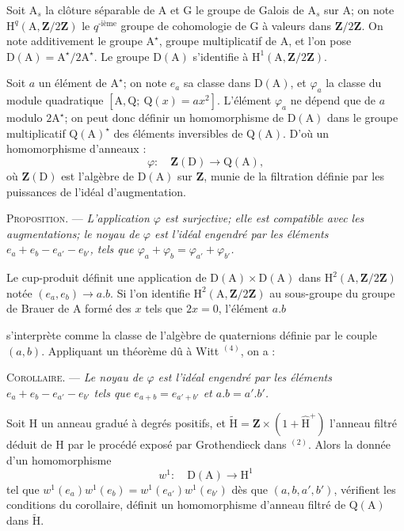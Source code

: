 Soit $\mathrm A_s$ la clôture séparable de $\mathrm A$ et $\mathrm G$ le groupe de Galois
de $\mathrm A_s$ sur $\mathrm A$; on note $\mathrm H^q(\mathrm A,\mathbf Z/2\mathbf Z)$
le $q^{\text{-ième}}$ groupe de cohomologie de $\mathrm G$ à valeurs dans
$\mathbf Z/2\mathbf Z$. On note additivement le groupe $\mathrm A^\star$,
groupe multiplicatif de $\mathrm A$, et l'on pose
$\mathrm D(\mathrm A)=\mathrm A^\star/2\mathrm A^\star$.
Le groupe $\mathrm D(\mathrm A)$ s'identifie à
$\mathrm H^1(\mathrm A,\mathbf Z/2\mathbf Z)$.

Soit $a$ un élément de $\mathrm A^\star$; on note $e_a$ sa classe dans
$\mathrm D(\mathrm A)$, et $\varphi_a$ la classe du module quadratique
$[\mathrm A,\mathrm Q;\ \mathrm Q(x)=ax^2]$.
L'élément $\varphi_a$ ne dépend que de $a$ modulo $2\mathrm A^\star$;
on peut donc définir un homomorphisme de $\mathrm D(\mathrm A)$ dans le groupe
multiplicatif $\mathrm Q(\mathrm A)^\star$ des éléments inversibles de $\mathrm Q(\mathrm A)$.
D'où un homomorphisme d'anneaux :
\[
\varphi:\quad\mathbf Z(\mathrm D)\to\mathrm Q(\mathrm A),
\]
où $\mathbf Z(\mathrm D)$ est l'algèbre de $\mathrm D(\mathrm A)$ sur $\mathbf Z$,
munie de la filtration définie par les puissances de l'idéal d'augmentation.

\textsc{Proposition.} --- \textit{L'application $\varphi$ est surjective; elle est
compatible avec les augmentations; le noyau de $\varphi$ est l'idéal engendré
par les éléments $e_a+e_b-e_{a'}-e_{b'}$, tels que
$\varphi_a+\varphi_b=\varphi_{a'}+\varphi_{b'}$.}

Le cup-produit définit une application de $\mathrm D(\mathrm A)\times\mathrm D(\mathrm A)$
dans $\mathrm H^2(\mathrm A,\mathbf Z/2\mathbf Z)$ notée $(e_a,e_b)\to a.b$.
Si l'on identifie $\mathrm H^2(\mathrm A,\mathbf Z/2\mathbf Z)$ au sous-groupe
du groupe de Brauer de $\mathrm A$ formé des $x$ tels que $2x=0$, l'élément $a.b$

s'interprète comme la classe de l'algèbre de quaternions définie par le
couple $(a,b)$. Appliquant un théorème dû à Witt $^{(4)}$, on a :

\textsc{Corollaire.} --- \textit{Le noyau de $\varphi$ est l'idéal engendré par les
éléments $e_a+e_b-e_{a'}-e_{b'}$ tels que $e_{a+b}=e_{a'+b'}$ et $a.b=a'.b'$.}

Soit $\mathrm H$ un anneau gradué à degrés positifs, et
$\widetilde{\mathrm H}=\mathbf Z\times(1+\widehat{\mathrm H}^{+})$
l'anneau filtré déduit de $\mathrm H$ par le procédé exposé par Grothendieck
dans $^{(2)}$. Alors la donnée d'un homomorphisme
\[
w^1:\quad\mathrm D(\mathrm A)\to\mathrm H^1
\]
tel que $w^1(e_a)w^1(e_b)=w^1(e_{a'})w^1(e_{b'})$ dès que
$(a,b,a',b')$, vérifient les conditions du corollaire, définit un homomorphisme
d'anneau filtré de $\mathrm Q(\mathrm A)$ dans $\widetilde{\mathrm H}$.

